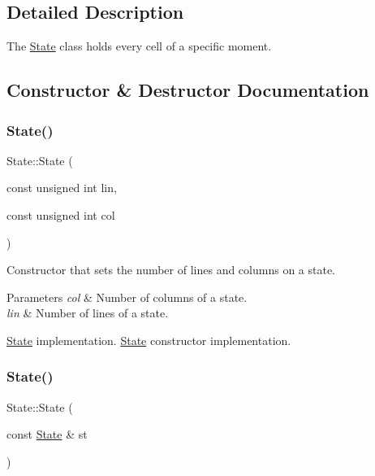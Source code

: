 \subsection{Detailed Description}
The \mbox{\hyperlink{class_state}{State}} class holds every cell of a specific moment. 

\subsection{Constructor \& Destructor Documentation}
\mbox{\label{class_state_aa2771d8b47729a04ae5a29e7a62fcd8b}} 
\subsubsection{\texorpdfstring{State()}{State()}\hspace{0.1cm}{\footnotesize\ttfamily [1/2]}}
{\footnotesize\ttfamily State\+::\+State (\begin{DoxyParamCaption}\item[{const unsigned int}]{lin,  }\item[{const unsigned int}]{col }\end{DoxyParamCaption})}

Constructor that sets the number of lines and columns on a state.


\begin{DoxyParams}{Parameters}
{\em col} & Number of columns of a state. \\
\hline
{\em lin} & Number of lines of a state.\\
\hline
\end{DoxyParams}
\mbox{\hyperlink{class_state}{State}} implementation. \mbox{\hyperlink{class_state}{State}} constructor implementation. \mbox{\label{class_state_a893ddf069c68f0b3b0b019f56787f6c5}} 
\subsubsection{\texorpdfstring{State()}{State()}\hspace{0.1cm}{\footnotesize\ttfamily [2/2]}}
{\footnotesize\ttfamily State\+::\+State (\begin{DoxyParamCaption}\item[{const \mbox{\hyperlink{class_state}{State}} \&}]{st }\end{DoxyParamCaption})}

